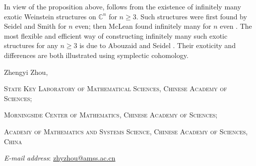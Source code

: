 \documentclass[reqno,11pt]{amsart}
\makeatletter
\numberwithin{equation}{section}
\def\C{{\mathbb C}}
\newcommand{\Addresses}{{
		\bigskip
		\footnotesize

	    Zhengyi Zhou, \par\nopagebreak
        \textsc{State Key Laboratory of Mathematical Sciences, Chinese Academy of Sciences;}\par\nopagebreak
	    \textsc{Morningside Center of Mathematics, Chinese Academy of Sciences;}\par\nopagebreak
         \textsc{Academy of Mathematics and Systems Science, Chinese Academy of Sciences, China}\par\nopagebreak
		\textit{E-mail address}: \href{mailto:zhyzhou@amss.ac.cn}{zhyzhou@amss.ac.cn}

}}
\makeatother
\begin{document}
In view of the proposition above,  follows from the existence of infinitely many exotic Weinstein structures on $\C^n$ for $n\ge 3$. Such structures were first found by Seidel and Smith \cite{zbMATH02242665} for $n$ even; then McLean found infinitely many for $n$ even \cite{zbMATH05553983}. The most flexible and efficient way of constructing infinitely many such exotic structures for any $n\ge 3$ is due to Abouzaid and Seidel \cite{abouzaid2010altering}. Their exoticity and differences are both illustrated using symplectic cohomology.
 

\Addresses
\end{document}
